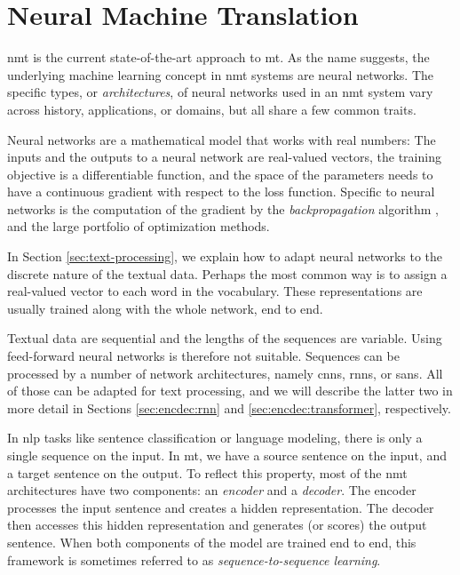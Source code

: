 \chapter{Neural Machine Translation}
\label{chap:nmt}



\Gls{nmt} is the current state-of-the-art approach to \gls{mt}. As the name
suggests, the underlying machine learning concept in \gls{nmt} systems are
neural networks. The specific types, or \emph{architectures}, of neural
networks used in an \gls{nmt} system vary across history, applications, or
domains, but all share a few common traits.

Neural networks are a mathematical model that works with real numbers: The
inputs and the outputs to a neural network are real-valued vectors, the
training objective is a differentiable function, and the space of the
parameters needs to have a continuous gradient with respect to the loss
function. Specific to neural networks is the computation of the gradient by the
\emph{backpropagation} algorithm , and the large portfolio of
optimization methods.

In Section \ref{sec:text-processing}, we explain how to adapt neural networks
to the discrete nature of the textual data. Perhaps the most common way is to
assign a real-valued vector to each word in the vocabulary. These
representations are usually trained along with the whole network, end to end.

Textual data are sequential and the lengths of the sequences are
variable. Using feed-forward neural networks is therefore not
suitable. Sequences can be processed by a number of network architectures,
namely \glspl{cnn}, \glspl{rnn}, or \glspl{san}. All of those can be adapted
for text processing, and we will describe the latter two in more detail in
Sections \ref{sec:encdec:rnn} and \ref{sec:encdec:transformer}, respectively.

In \acrshort{nlp} tasks like sentence classification or language modeling,
there is only a single sequence on the input. In \acrshort{mt}, we have a
source sentence on the input, and a target sentence on the output. To reflect
this property, most of the \gls{nmt} architectures have two components: an
\emph{encoder} and a \emph{decoder}. The encoder processes the input sentence
and creates a hidden representation. The decoder then accesses this hidden
representation and generates (or scores) the output sentence. When both
components of the model are trained end to end, this framework is sometimes
referred to as \emph{sequence-to-sequence learning}. 


